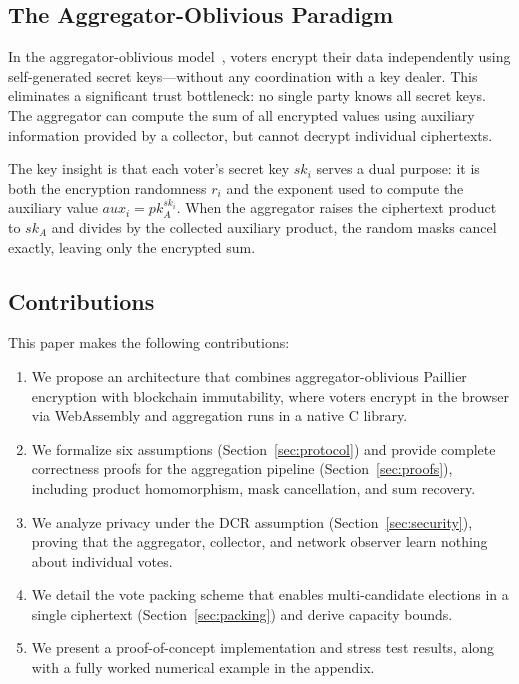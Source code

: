 \documentclass[11pt, a4paper]{article}
\begin{document}
\subsection{The Aggregator-Oblivious Paradigm}

In the aggregator-oblivious model~\cite{lem14b}, voters encrypt their data independently using self-generated secret keys---without any coordination with a key dealer. This eliminates a significant trust bottleneck: no single party knows all secret keys. The aggregator can compute the sum of all encrypted values using auxiliary information provided by a collector, but cannot decrypt individual ciphertexts.

The key insight is that each voter's secret key $sk_i$ serves a dual purpose: it is both the encryption randomness $r_i$ and the exponent used to compute the auxiliary value $aux_i = pk_A^{sk_i}$. When the aggregator raises the ciphertext product to $sk_A$ and divides by the collected auxiliary product, the random masks cancel exactly, leaving only the encrypted sum.

\subsection{Contributions}

This paper makes the following contributions:

\begin{enumerate}[leftmargin=*]
    \item We propose an architecture that combines aggregator-oblivious Paillier encryption with blockchain immutability, where voters encrypt in the browser via WebAssembly and aggregation runs in a native C library.
    \item We formalize six assumptions (Section~\ref{sec:protocol}) and provide complete correctness proofs for the aggregation pipeline (Section~\ref{sec:proofs}), including product homomorphism, mask cancellation, and sum recovery.
    \item We analyze privacy under the DCR assumption (Section~\ref{sec:security}), proving that the aggregator, collector, and network observer learn nothing about individual votes.
    \item We detail the vote packing scheme that enables multi-candidate elections in a single ciphertext (Section~\ref{sec:packing}) and derive capacity bounds.
    \item We present a proof-of-concept implementation and stress test results, along with a fully worked numerical example in the appendix.
\end{enumerate}
\end{document}
